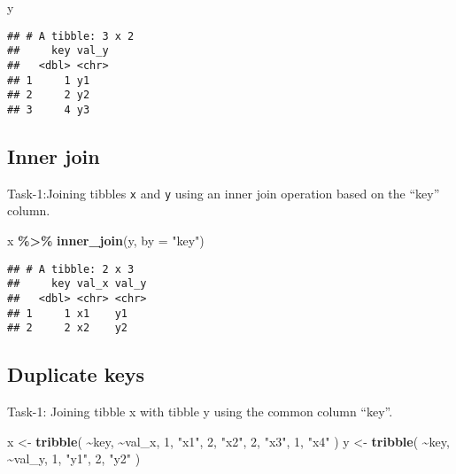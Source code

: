 \documentclass[
]{article}
\newenvironment{Shaded}{\begin{snugshade}}{\end{snugshade}}
\newcommand{\AttributeTok}[1]{\textcolor[rgb]{0.13,0.29,0.53}{#1}}
\newcommand{\DecValTok}[1]{\textcolor[rgb]{0.00,0.00,0.81}{#1}}
\newcommand{\FunctionTok}[1]{\textcolor[rgb]{0.13,0.29,0.53}{\textbf{#1}}}
\newcommand{\NormalTok}[1]{#1}
\newcommand{\OtherTok}[1]{\textcolor[rgb]{0.56,0.35,0.01}{#1}}
\newcommand{\SpecialCharTok}[1]{\textcolor[rgb]{0.81,0.36,0.00}{\textbf{#1}}}
\newcommand{\StringTok}[1]{\textcolor[rgb]{0.31,0.60,0.02}{#1}}
\begin{document}
\begin{Shaded}
\begin{Highlighting}[]
\NormalTok{y}
\end{Highlighting}
\end{Shaded}

\begin{verbatim}
## # A tibble: 3 x 2
##     key val_y
##   <dbl> <chr>
## 1     1 y1   
## 2     2 y2   
## 3     4 y3
\end{verbatim}

\hypertarget{inner-join}{%
\subsection{Inner join}\label{inner-join}}

Task-1:Joining tibbles \texttt{x} and \texttt{y} using an inner join
operation based on the ``key'' column.

\begin{Shaded}
\begin{Highlighting}[]
\NormalTok{x }\SpecialCharTok{\%\textgreater{}\%} 
  \FunctionTok{inner\_join}\NormalTok{(y, }\AttributeTok{by =} \StringTok{"key"}\NormalTok{)}
\end{Highlighting}
\end{Shaded}

\begin{verbatim}
## # A tibble: 2 x 3
##     key val_x val_y
##   <dbl> <chr> <chr>
## 1     1 x1    y1   
## 2     2 x2    y2
\end{verbatim}

\hypertarget{duplicate-keys}{%
\subsection{Duplicate keys}\label{duplicate-keys}}

Task-1: Joining tibble x with tibble y using the common column ``key''.

\begin{Shaded}
\begin{Highlighting}[]
\NormalTok{x }\OtherTok{\textless{}{-}} \FunctionTok{tribble}\NormalTok{(}
  \SpecialCharTok{\textasciitilde{}}\NormalTok{key, }\SpecialCharTok{\textasciitilde{}}\NormalTok{val\_x,}
     \DecValTok{1}\NormalTok{, }\StringTok{"x1"}\NormalTok{,}
     \DecValTok{2}\NormalTok{, }\StringTok{"x2"}\NormalTok{,}
     \DecValTok{2}\NormalTok{, }\StringTok{"x3"}\NormalTok{,}
     \DecValTok{1}\NormalTok{, }\StringTok{"x4"}
\NormalTok{)}
\NormalTok{y }\OtherTok{\textless{}{-}} \FunctionTok{tribble}\NormalTok{(}
  \SpecialCharTok{\textasciitilde{}}\NormalTok{key, }\SpecialCharTok{\textasciitilde{}}\NormalTok{val\_y,}
     \DecValTok{1}\NormalTok{, }\StringTok{"y1"}\NormalTok{,}
     \DecValTok{2}\NormalTok{, }\StringTok{"y2"}
\NormalTok{)}
\end{Highlighting}
\end{Shaded}
\end{document}
